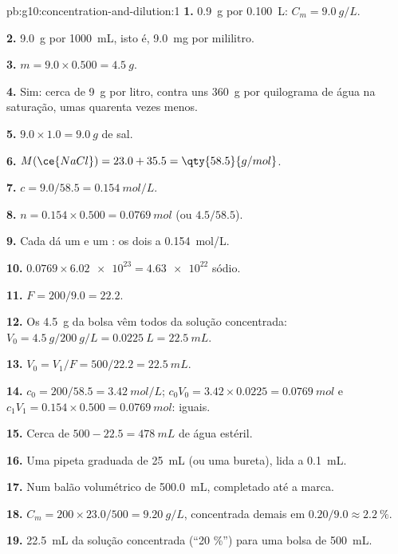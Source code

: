 \begin{solution}{pb:g10:concentration-and-dilution:1}
\textbf{1.} \qty{0.9}{g} por \qty{0.100}{L}: $C_m = \qty{9.0}{g/L}$.

\textbf{2.} \qty{9.0}{g} por \qty{1000}{mL}, isto é, \qty{9.0}{mg} por
mililitro.

\textbf{3.} $m = 9.0 \times 0.500 = \qty{4.5}{g}$.

\textbf{4.} Sim: cerca de \qty{9}{g} por litro, contra uns \qty{360}{g}
por quilograma de água na saturação, umas quarenta vezes menos.

\textbf{5.} $9.0 \times 1.0 = \qty{9.0}{g}$ de sal.

\textbf{6.} $M(\ce{NaCl}) = 23.0 + 35.5 = \qty{58.5}{g/mol}$.

\textbf{7.} $c = 9.0 / 58.5 = \qty{0.154}{mol/L}$.

\textbf{8.} $n = 0.154 \times 0.500 = \qty{0.0769}{mol}$ (ou
$4.5 / 58.5$).

\textbf{9.} Cada  dá um  e um : os dois a
\qty{0.154}{mol/L}.

\textbf{10.} $0.0769 \times \num{6.02e23} = \num{4.63e22}$  sódio.

\textbf{11.} $F = 200 / 9.0 = 22.2$.

\textbf{12.} Os \qty{4.5}{g} da bolsa vêm todos da solução concentrada:
$V_0 = \qty{4.5}{g} / \qty{200}{g/L} = \qty{0.0225}{L} =
\qty{22.5}{mL}$.

\textbf{13.} $V_0 = V_1 / F = 500 / 22.2 = \qty{22.5}{mL}$.

\textbf{14.} $c_0 = 200 / 58.5 = \qty{3.42}{mol/L}$;
$c_0 V_0 = 3.42 \times 0.0225 = \qty{0.0769}{mol}$ e
$c_1 V_1 = 0.154 \times 0.500 = \qty{0.0769}{mol}$: iguais.

\textbf{15.} Cerca de $500 - 22.5 = \qty{478}{mL}$ de água estéril.

\textbf{16.} Uma pipeta graduada de \qty{25}{mL} (ou uma bureta), lida
a \qty{0.1}{mL}.

\textbf{17.} Num balão volumétrico de \qty{500.0}{mL}, completado até a
marca.

\textbf{18.} $C_m = 200 \times 23.0 / 500 = \qty{9.20}{g/L}$,
concentrada demais em $0.20 / 9.0 \approx \qty{2.2}{\percent}$.

\textbf{19.} \qty{22.5}{mL} da solução concentrada (``20 \%'') para uma
bolsa de \qty{500}{mL}.
\end{solution}
